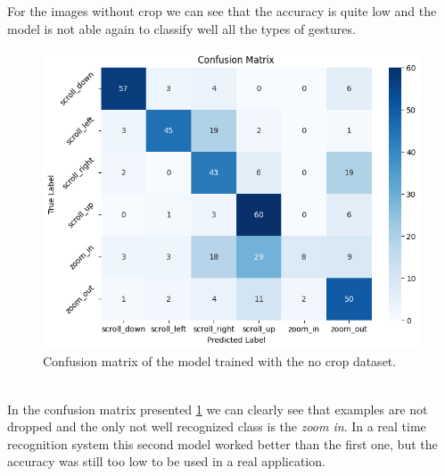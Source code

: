 \documentclass[10pt,twocolumn,letterpaper]{article}
\begin{document}
For the images without crop we can see that the accuracy is quite low and the model is not 
able again to classify well all the types of gestures.
\begin{figure}[h]
   \centering
   \includegraphics[width=1\linewidth]{images/matrix_confusion2.png}
   \caption{Confusion matrix of the model trained with the no crop dataset.}
   \label{fig:noCropConfusionMatrix}
\end{figure} \\
In the confusion matrix presented \ref{fig:noCropConfusionMatrix} we can clearly see 
that examples are not dropped and the only not well recognized class is the \textit{zoom in}.
In a real time recognition system this second model worked better than the 
first one, but the accuracy was still too low to be used in a real application.
\end{document}
